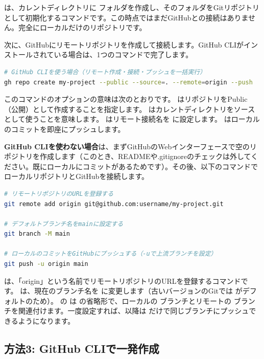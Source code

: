  は、カレントディレクトリに  フォルダを作成し、そのフォルダをGitリポジトリとして初期化するコマンドです。この時点ではまだGitHubとの接続はありません。完全にローカルだけのリポジトリです。

次に、GitHubにリモートリポジトリを作成して接続します。GitHub CLIがインストールされている場合は、1つのコマンドで完了します。

\begin{lstlisting}[language=bash]
# GitHub CLIを使う場合（リモート作成・接続・プッシュを一括実行）
gh repo create my-project --public --source=. --remote=origin --push
\end{lstlisting}

このコマンドのオプションの意味は次のとおりです。 はリポジトリをPublic（公開）として作成することを指定します。 はカレントディレクトリをソースとして使うことを意味します。 はリモート接続名を  に設定します。 はローカルのコミットを即座にプッシュします。

\textbf{GitHub CLIを使わない場合}は、まずGitHubのWebインターフェースで空のリポジトリを作成します（このとき、READMEや.gitignoreのチェックは外してください。既にローカルにコミットがあるためです）。その後、以下のコマンドでローカルリポジトリとGitHubを接続します。

\begin{lstlisting}[language=bash]
# リモートリポジトリのURLを登録する
git remote add origin git@github.com:username/my-project.git

# デフォルトブランチ名をmainに設定する
git branch -M main

# ローカルのコミットをGitHubにプッシュする（-uで上流ブランチを設定）
git push -u origin main
\end{lstlisting}

 は、「origin」という名前でリモートリポジトリのURLを登録するコマンドです。 は、現在のブランチ名を  に変更します（古いバージョンのGitでは  がデフォルトのため）。 の  は  の省略形で、ローカルの  ブランチとリモートの  ブランチを関連付けます。一度設定すれば、以降は  だけで同じブランチにプッシュできるようになります。

\subsection{方法3: GitHub CLIで一発作成}


